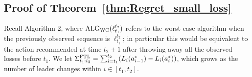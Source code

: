 \subsection{Proof of Theorem~\ref{thm:Regret_small_loss}}
Recall Algorithm 2, where $\text{ALG}_{\text{WC}}(\ell_{t_1}^{t_2})$ refers to the worst-case algorithm when the previously observed sequence is $\ell_{t_1}^{t_2}$; in particular this would be equivalent to the action recommended at time $t_2 + 1$ after throwing away all the observed losses before $t_1$. 
We let $\Sigma^{\text{FTL}}_{t_1:t_2} = 
\sum_{i=t_1}^{t_2} (L_i(a^*_{i-1}) - L_i(a^*_i))$, which grows as the number of leader changes within $i \in [t_1, t_2]$.


    

    

